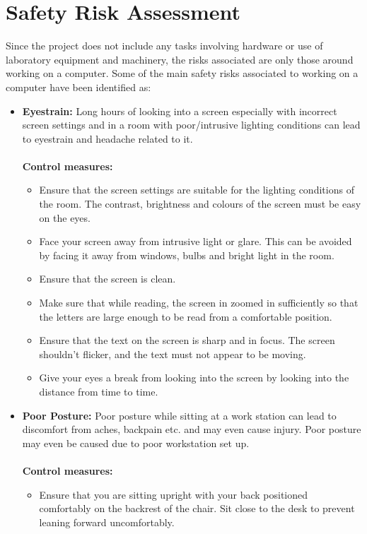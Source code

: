 \documentclass[a4paper,12pt]{report}
\begin{document}
\section{Safety Risk Assessment}
Since the project does not include any tasks involving hardware or use of laboratory equipment and machinery, the risks associated are only those around working on a computer. Some of the main safety risks associated to working on a computer have been identified as:
\begin{itemize}
	\item  	\textbf{Eyestrain:} Long hours of looking into a screen especially with incorrect screen settings and in a room with poor/intrusive lighting conditions can lead to eyestrain and headache related to it. \\ \\
	\textbf{Control measures:}
	\begin{itemize}
		\item Ensure that the screen settings are suitable for the lighting conditions of the room. The contrast, brightness and colours of the screen must be easy on the eyes.
		\item Face your screen away from intrusive light or glare. This can be avoided by facing it away from windows, bulbs and bright light in the room.
		\item Ensure that the screen is clean.
		\item Make sure that while reading, the screen in zoomed in sufficiently so that the letters are large enough to be read from a comfortable position.
		\item Ensure that the text on the screen is sharp and in focus. The screen shouldn’t flicker, and the text must not appear to be moving.
		\item Give your eyes a break from looking into the screen by looking into the distance from time to time.
	\end{itemize}
	\item \textbf{Poor Posture:} Poor posture while sitting at a work station can lead to discomfort from aches, backpain etc. and may even cause injury. Poor posture may even be caused due to poor workstation set up.\\ \\
	\textbf{Control measures:}
	\begin{itemize}
		\item Ensure that you are sitting upright with your back positioned comfortably on the backrest of the chair. Sit close to the desk to prevent leaning forward uncomfortably.

\end{itemize}
\end{itemize}
\end{document}
